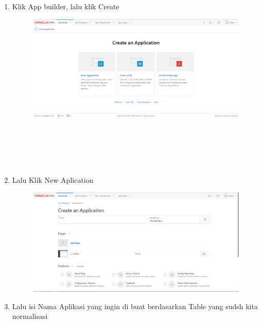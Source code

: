 \documentclass[12pt, times new roman, a4paper]{article}
\begin{document}
\begin{enumerate}
\item Klik App builder, lalu klik Create
\begin{figure} [h]
	\centering
		\includegraphics[scale=0.4]{gambar/4}
\end{figure}
\\
\\
\\
\\
\item Lalu Klik New Aplication
\begin{figure} [h]
	\centering
		\includegraphics[scale=0.4]{gambar/15}
\end{figure}

\item Lalu isi Nama Aplikasi yang ingin di buat berdasarkan Table yang sudsh kita normalisasi


\end{enumerate}
\end{document}
